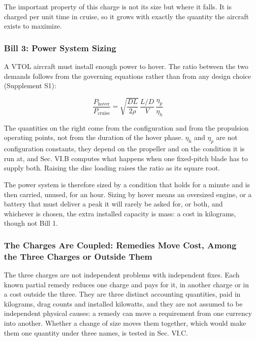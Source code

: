 \documentclass[journal]{new-aiaa}
\begin{document}
The important property of this charge is not its size but where it falls. It is charged per unit time in cruise, so it grows with exactly the quantity the aircraft exists to maximize.

\subsubsection{Bill 3: Power System Sizing}

A VTOL aircraft must install enough power to hover. The ratio between the two demands follows from the governing equations rather than from any design choice (Supplement S1):

\begin{equation}
\frac{P_\mathrm{hover}}{P_\mathrm{cruise}} = \sqrt{\frac{DL}{2\rho}}\,\frac{L/D}{V}\,\frac{\eta_p}{\eta_h}
\end{equation}

The quantities on the right come from the configuration and from the propulsion operating points, not from the duration of the hover phase. $\eta_h$ and $\eta_p$ are not configuration constants, they depend on the propeller and on the condition it is run at, and Sec. VI.B computes what happens when one fixed-pitch blade has to supply both. Raising the disc loading raises the ratio as its square root.

The power system is therefore sized by a condition that holds for a minute and is then carried, unused, for an hour. Sizing by hover means an oversized engine, or a battery that must deliver a peak it will rarely be asked for, or both, and whichever is chosen, the extra installed capacity is mass: a cost in kilograms, though not Bill 1.

\subsubsection{The Charges Are Coupled: Remedies Move Cost, Among the Three Charges or Outside Them}

The three charges are not independent problems with independent fixes. Each known partial remedy reduces one charge and pays for it, in another charge or in a cost outside the three. They are three distinct accounting quantities, paid in kilograms, drag counts and installed kilowatts, and they are not assumed to be independent physical causes: a remedy can move a requirement from one currency into another. Whether a change of size moves them together, which would make them one quantity under three names, is tested in Sec. VI.C.
\end{document}
